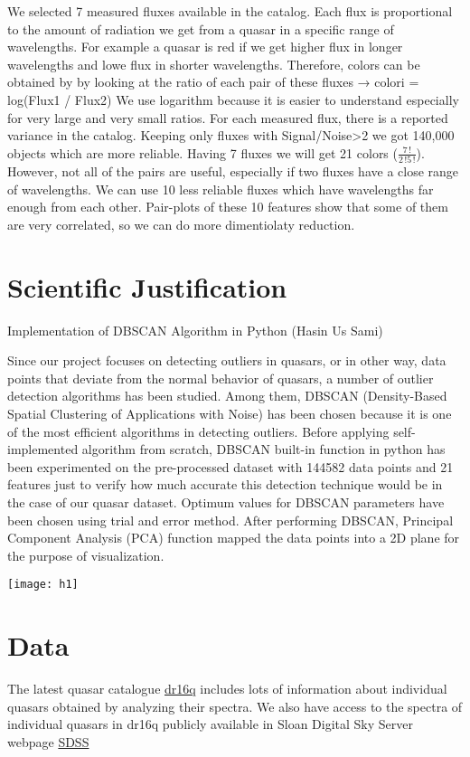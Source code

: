 \documentclass[usenatbib,a4paper,fleqn]{article}
\begin{document}
We selected 7  measured fluxes available in the catalog. Each flux is proportional to the amount of 
radiation we get from a quasar in a specific range of wavelengths. For example a quasar is red if we
 get higher flux in longer wavelengths and lowe flux in shorter wavelengths.  Therefore, colors can be 
 obtained by by looking at the ratio of each pair of these fluxes → colori = log(Flux1 / Flux2) 
We use logarithm because it is easier to understand especially for very large and very small ratios. 
For each measured flux, there is a reported variance in the catalog. Keeping only fluxes with  Signal/Noise>2 
 we got 140,000 objects which are more reliable. Having 7 fluxes we will get 21 colors ($\frac{7\,!}{2\,!5\,!}$). 
 However, not all of the pairs are useful, especially if two fluxes have a close range of wavelengths. 
 We can use 10 less reliable fluxes which have wavelengths far enough from each other. Pair-plots of these 
 10 features show that some of them are very correlated, so we can do more dimentiolaty reduction. 

\section*{ Scientific Justification}
Implementation of DBSCAN Algorithm in Python (Hasin Us Sami)

Since our project focuses on detecting outliers in quasars, or in other way, data points that deviate from the normal
 behavior of quasars, a number of outlier detection algorithms has been studied.
  Among them, DBSCAN (Density-Based Spatial Clustering of Applications with Noise)
   has been chosen because it is one of the most efficient algorithms in detecting outliers. 
Before applying self-implemented algorithm from scratch, DBSCAN built-in function 
in python has been experimented on the pre-processed dataset with 144582 data 
points and 21 features just to verify how much accurate this detection technique 
would be in the case of our quasar dataset. Optimum values for DBSCAN parameters 
have been chosen using trial and error method.  After performing DBSCAN, Principal
Component Analysis (PCA) function mapped the data points into a 2D plane for the purpose of visualization. 

\texttt{[image: h1]}

\section*{Data }
The latest quasar catalogue \href{https://www.sdss.org/dr16/algorithms/qso_catalog}{dr16q} includes lots of information 
about individual quasars obtained by analyzing their spectra. 
We also have access to the spectra of individual quasars in dr16q publicly available in Sloan Digital Sky Server webpage 
\href{https://www.sdss.org/dr16/spectro}{SDSS}
\end{document}
